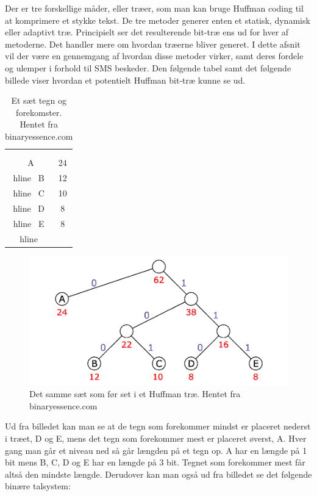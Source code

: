 Der er tre forskellige måder, eller træer, som man kan bruge Huffman coding til at komprimere et stykke tekst. De tre metoder generer enten et statisk, dynamisk eller adaptivt træ. Principielt ser det resulterende bit-træ ens ud for hver af metoderne. Det handler mere om hvordan træerne bliver generet. I dette afsnit vil der være en gennemgang af hvordan disse metoder virker, samt deres fordele og ulemper i forhold til SMS beskeder. Den følgende tabel samt det følgende billede viser hvordan et potentielt Huffman bit-træ kunne se ud.

\begin{table}[H]
\begin{center}
\begin{tabular}{|c|c|}
    \hline
    \cellcolor{ForestGreen}\color{white}{\textbf{Tegn}}\\[2ex] &  \cellcolor{ForestGreen}\color{white}{\textbf{Forekomster}}\\[2ex] \hline
    \ A & 24 \\hline
    \ B & 12 \\hline
    \ C & 10 \\hline
    \ D & 8 \\hline
    \ E & 8 \\hline
\end{tabular} 
\caption{Et sæt tegn og forekomster. Hentet fra binaryessence.com}
\end{center}
\end{table}

\begin{figure}[H]
\centering
\includegraphics[width=\linewidth]{Billeder/huffman_tree.png}
\caption{Det samme sæt som før set i et Huffman træ. Hentet fra binaryessence.com}
\label{fig:huffmantree_fred}
\end{figure}

Ud fra billedet kan man se at de tegn som forekommer mindst er placeret nederst i træet, D og E, mens det tegn som forekommer mest er placeret øverst, A. Hver gang man går et niveau ned så går længden på et tegn op. A har en længde på 1 bit mens B, C, D og E har en længde på 3 bit. Tegnet som forekommer mest får altså den mindste længde. Derudover kan man også ud fra billedet se det følgende binære talsystem:

